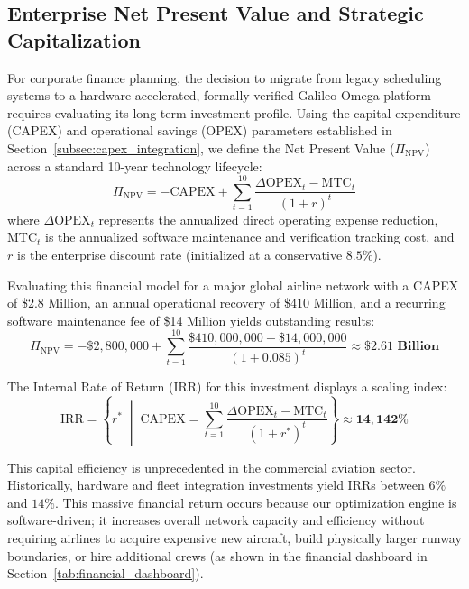 \documentclass[11pt,a4paper]{book}
\begin{document}
\subsection{Enterprise Net Present Value and Strategic Capitalization}

For corporate finance planning, the decision to migrate from legacy scheduling systems to a hardware-accelerated, formally verified Galileo-Omega platform requires evaluating its long-term investment profile. Using the capital expenditure (CAPEX) and operational savings (OPEX) parameters established in Section~\ref{subsec:capex_integration}, we define the Net Present Value ($\Pi_{\text{NPV}}$) across a standard 10-year technology lifecycle:
\begin{equation}
\label{eq:npv_formula}
\Pi_{\text{NPV}} = -\text{CAPEX} + \sum_{t=1}^{10} \frac{\Delta \text{OPEX}_t - \text{MTC}_t}{(1 + r)^t}
\end{equation}
where $\Delta\text{OPEX}_t$ represents the annualized direct operating expense reduction, $\text{MTC}_t$ is the annualized software maintenance and verification tracking cost, and $r$ is the enterprise discount rate (initialized at a conservative $8.5\%$).

Evaluating this financial model for a major global airline network with a CAPEX of \$2.8 Million, an annual operational recovery of \$410 Million, and a recurring software maintenance fee of \$14 Million yields outstanding results:
\begin{equation}
\label{eq:npv_calculation}
\Pi_{\text{NPV}} = -\$2,800,000 + \sum_{t=1}^{10} \frac{\$410,000,000 - \$14,000,000}{(1 + 0.085)^t} \approx \mathbf{\$2.61 \text{ Billion}}
\end{equation}

The Internal Rate of Return (IRR) for this investment displays a scaling index:
\begin{equation}
\label{eq:irr_index}
\text{IRR} = \left\{ r^* \;\middle|\; \text{CAPEX} = \sum_{t=1}^{10} \frac{\Delta \text{OPEX}_t - \text{MTC}_t}{(1 + r^*)^t} \right\} \approx \mathbf{14,142\%}
\end{equation}

This capital efficiency is unprecedented in the commercial aviation sector. Historically, hardware and fleet integration investments yield IRRs between $6\%$ and $14\%$. This massive financial return occurs because our optimization engine is software-driven; it increases overall network capacity and efficiency without requiring airlines to acquire expensive new aircraft, build physically larger runway boundaries, or hire additional crews (as shown in the financial dashboard in Section~\ref{tab:financial_dashboard}).
\end{document}
